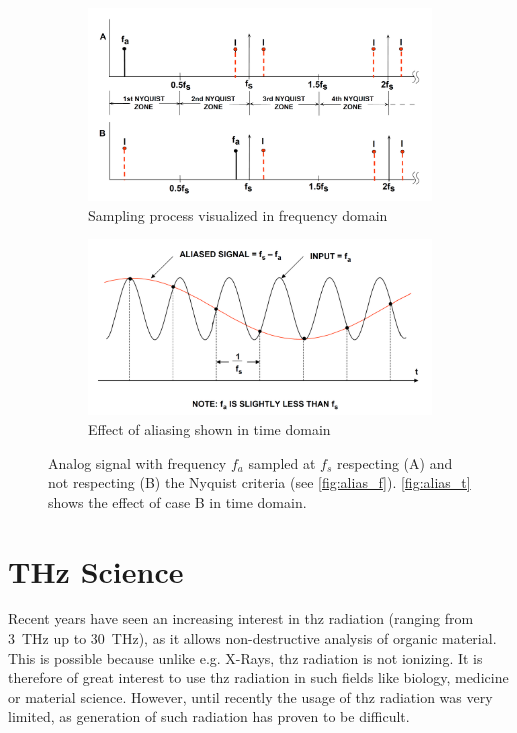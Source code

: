 \begin{figure}[tbh]
	\centering
	\begin{subfigure}{\textwidth}
		\centering
		\includegraphics[width=\linewidth]{chap/02-theory/img/alias_f}  
		\caption{Sampling process visualized in frequency domain}
		\label{fig:alias_f}
	\end{subfigure}
	\begin{subfigure}{\textwidth}
		\centering
		\includegraphics[width=\linewidth]{chap/02-theory/img/alias_t}  
		\caption{Effect of aliasing shown in time domain}
		\label{fig:alias_t}
	\end{subfigure}
	\caption[Aliasing]{Analog signal with frequency $f_a$ sampled at $f_s$ respecting (A) and not respecting (B) the Nyquist criteria (see \autoref{fig:alias_f}). \autoref{fig:alias_t} shows the effect of case B in time domain. \cite{walt}}
	\label{fig:aliasing}
\end{figure}



\section{THz Science}
Recent years have seen an increasing interest in \gls{thz} radiation (ranging from \SI{3}{\tera \hertz} up to \SI{30}{\tera \hertz}), as it allows non-destructive analysis of organic material. 
This is possible because unlike e.g. X-Rays, \gls{thz} radiation is not ionizing.
It is therefore of great interest to use \gls{thz} radiation in such fields like biology, medicine or material science.
However, until recently the usage of \gls{thz} radiation was very limited, as generation of such radiation has proven to be difficult.

